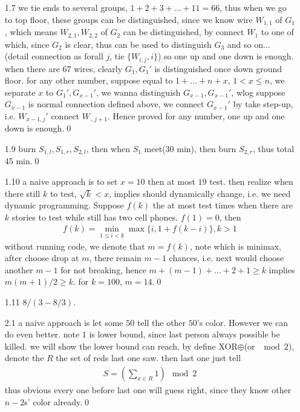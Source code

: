 \documentclass[paper=a4, fontsize=11pt]{scrartcl} %
\numberwithin{equation}{section} %
\numberwithin{figure}{section} %
\numberwithin{table}{section} %
\begin{document}
\begin{itemize}
	 \item[1.7] we tie ends to several groups, $1+2+3+\dots+11=66$, thus when we go to top floor, these groups can be distinguished, since we know wire $W_{1,1}$ of $G_1$, which means $W_{2,1}, W_{2,2}$ of $G_{2}$ can be distinguished, by connect $W_1$ to one of which, since $G_2$ is clear, thus can be used to distinguish $G_3$ and so on... (detail connection as forall $j$, tie $\{W_{i,j}, i\}$) so one up and one down is enough. when there are 67 wires, clearly $G_1,G_1'$ is distinguished once down ground floor. for any other number, suppose equal to $1+\dots+n +x$, $1<x\leq n$, we separate $x$ to $G_1', G_{x-1}'$, we wanna distinguish $G_{x-1},G_{x-1}'$, wlog suppose $G_{x-1}$ is normal connection defined above, we connect $G_{x-1}'$ by take step-up, i.e. $W_{x-1,j}'$ connect $W_{.,j+1}$. Hence proved for any number, one up and one down is enough.\qed
	 \item[1.9] burn $S_{1,l},S_{1,r},S_{2,l}$, then when $S_1$ meet(30 min), then burn $S_{2,r}$, thus total 45 min.\qed
	 \item[1.10] a naive approach is to set $x=10$ then at most $19$ test. then realize when there still $k$ to test, $\sqrt{k} < x$, implies should dynamically change, i.e. we need dynamic programming. Suppose $f(k)$ the at most test times when there are $k$ stories to test while still has two cell phones. $f(1)=0$, then
	 \begin{align}
	 	f(k) = \min_{1\leq i< k} \max \{i, 1+f(k-i)\}, k>1
	 \end{align}
	 without running code, we denote that $m=f(k)$, note which is minimax, after choose drop at $m$, there remain $m-1$ chances, i.e. next would choose another $m-1$ for not breaking, hence $m+(m-1)+\dots + 2+1\geq k$ implies $m(m+1)/2\geq k$. for $k=100$, $m=14$.\qed
	 \item[1.11] $8/(3-8/3)$.
	 \item[2.1] a naive approach is let some $50$ tell the other $50$'s color. However we can do even better. note $1$ is lower bound, since last person always possible be killed. we will show the lower bound can reach, by define XOR$\oplus$(or $\mod 2$), denote the $R$ the set of reds last one saw. then last one just tell
	 \begin{align}
	 	S = (\sum_{x\in R} 1) \mod 2
	 \end{align}
	 thus obvious every one before last one will guess right, since they know other $n-2$s' color already.\qed

\end{itemize}
\end{document}
